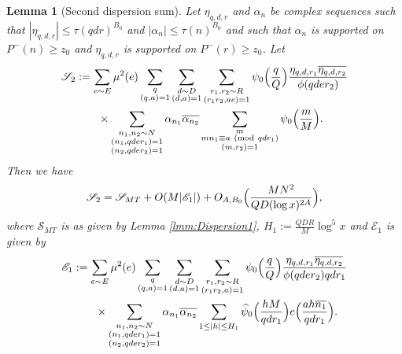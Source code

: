 \documentclass[10pt]{amsart}
\theoremstyle{plain}
\newtheorem{lmm}[thrm]{Lemma}
\numberwithin{equation}{section}
\newcommand{\Mod}[1]{\ (\mathrm{mod}\ #1)}
\renewcommand{\hat}[1]{\widehat #1}
\begin{document}
 \begin{lmm}[Second dispersion sum]\label{lmm:Dispersion2}
Let $\eta_{q,d,r}$ and $\alpha_n$ be complex sequences such that $|\eta_{q,d,r}|\le \tau(q d r)^{B_0}$ and $|\alpha_n|\le \tau(n)^{B_0}$ and such that $\alpha_n$ is supported on $P^-(n)\ge z_0$ and $\eta_{q, d,r}$ is supported on $P^-(r)\ge z_0$. Let
 \begin{align*}
 \mathscr{S}_{2}&:=\sum_{e\sim E}\mu^2(e)\sum_{\substack{q\\ (q,a)=1}}\sum_{\substack{d\sim D\\ (d,a)=1}}\sum_{\substack{r_1,r_2\sim R\\ (r_1r_2,ae)=1}}\psi_0\Bigl(\frac{q}{Q}\Bigr)\frac{\eta_{q,d,r_1}\overline{\eta_{q,d,r_2}} }{\phi(q d e r_2)}\\
 &\qquad\times\sum_{\substack{n_1,n_2\sim N\\ (n_1,q d e r_1)=1\\(n_2,q d e r_2)=1}}\alpha_{n_1}\overline{\alpha_{n_2}}\sum_{\substack{m\\ m n_1\equiv a\Mod{q d r_1}\\ (m,r_2)=1}} \psi_0\Bigl(\frac{m}{M}\Bigr).
 \end{align*}
 Then we have
\begin{equation*}
\mathscr{S}_{2}=\mathscr{S}_{MT}+O(M|\mathscr{E}_{1}|)+O_{A,B_0}\Bigl(\frac{MN^2}{Q D (\log{x})^{2A}}\Bigr),
\end{equation*}
where $\mathscr{S}_{MT}$ is as given by Lemma \ref{lmm:Dispersion1}, $H_1:=\frac{Q D R}{M}\log^5{x}$ and $\mathscr{E}_{1}$ is given by
\begin{align*}
\mathscr{E}_{1}&:=\sum_{e\sim E}\mu^2(e)\sum_{\substack{q\\ (q,a)=1}}\sum_{\substack{d\sim D\\ (d,a)=1}}\sum_{\substack{r_1,r_2\sim R\\ (r_1r_2,a)=1}}\psi_0\Bigl(\frac{q}{Q}\Bigr)\frac{\eta_{q,d,r_1}\overline{\eta_{q,d,r_2}} }{\phi(q d e r_2)q d r_1}\\
&\qquad \times\sum_{\substack{n_1,n_2\sim N\\ (n_1,q d e r_1)=1\\(n_2,q d e  r_2)=1}}\alpha_{n_1}\overline{\alpha_{n_2}}\sum_{1\le |h|\le H_1}\hat{\psi}_0\Bigl(\frac{h M}{q d r_1}\Bigr)e\Bigl( \frac{a h \overline{ n_1}}{q d r_1}\Bigr).
\end{align*}
 \end{lmm}
%
%
%
\end{document}
